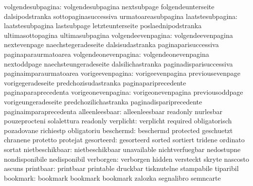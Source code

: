         volgendesubpagina: volgendesubpagina         nextsubpage
                           folgendeunterseite        dalsipodstranka
                           sottopaginasuccessiva     urmatoareasubpagina
         laatstesubpagina: laatstesubpagina          lastsubpage
                           letzteunterseite          poslaednipodstranka
                           ultimasottopagina         ultimasubpagina
       volgendeevenpagina: volgendeevenpagina        nextevenpage
                           naechstegeradeseite       dalsisudastranka
                           paginaparisuccessiva      paginaparaurmatoarea
     volgendeonevenpagina: volgendeonevenpagina      nextoddpage
                           naechsteungeradeseite     dalsilichastranka
                           paginadisparisuccessiva   paginaimparaurmatoarea
         vorigeevenpagina: vorigeevenpagina          previousevenpage
                           vorigegeradeseite         predchozisudastranka
                           paginapariprecedente      paginaparaprecedenta
       vorigeonevenpagina: vorigeonevenpagina        previousoddpage
                           vorigeungeradeseite       predchozilichastranka
                           paginadispariprecedente   paginaimparaprecedenta
           alleenleesbaar: alleenleesbaar            readonly
                           nurlesbar                 pouzeprocteni
                           solalettura               readonly
                verplicht: verplicht                 required
                           obligatorisch             pozadovane
                           richiestp                 obligatoriu
                beschermd: beschermd                 protected
                           geschuetzt                chranene
                           protetto                  protejat
               gesorteerd: gesorteerd                sorted
                           sortiert                  tridene
                           ordinato                  sortat
          nietbeschikbaar: nietbeschikbaar           unavailable
                           nichtverfuegbar           nedostupne
                           nondisponibile            nedisponibil
                verborgen: verborgen                 hidden
                           versteckt                 skryte
                           nascosto                  ascuns
                printbaar: printbaar                 printable
                           druckbar                  tisknutelne
                           stampabile                tiparibil
                 bookmark: bookmark                  bookmark
                           bookmark                  zalozka
                           segnalibro                semncarte
\stopvariables


